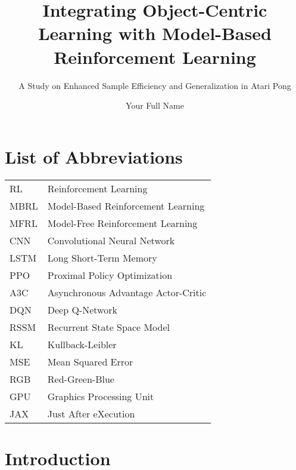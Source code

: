 \documentclass[
	english,
	ruledheaders=section,
	class=report,
	thesis={type=master},
	accentcolor=9c,
	custommargins=true,
	marginpar=false,
	parskip=half-,
	fontsize=11pt,
]{tudapub}
\begin{document}

\title{Integrating Object-Centric Learning with Model-Based Reinforcement Learning}
\subtitle{A Study on Enhanced Sample Efficiency and Generalization in Atari Pong}
\author[Y. Name]{Your Full Name}


\submissiondate{\today}
\examdate{\today}

\maketitle

\affidavit

\tableofcontents
\listoffigures
\listoftables

\chapter*{List of Abbreviations}
\begin{tabular}{ll}
RL & Reinforcement Learning \\
MBRL & Model-Based Reinforcement Learning \\
MFRL & Model-Free Reinforcement Learning \\
CNN & Convolutional Neural Network \\
LSTM & Long Short-Term Memory \\
PPO & Proximal Policy Optimization \\
A3C & Asynchronous Advantage Actor-Critic \\
DQN & Deep Q-Network \\
RSSM & Recurrent State Space Model \\
KL & Kullback-Leibler \\
MSE & Mean Squared Error \\
RGB & Red-Green-Blue \\
GPU & Graphics Processing Unit \\
JAX & Just After eXecution \\
\end{tabular}

\chapter{Introduction}
\label{chap:introduction}
\end{document}
